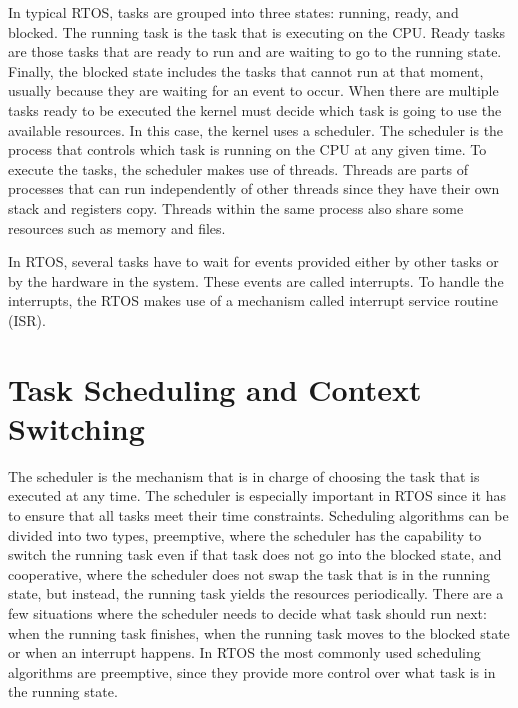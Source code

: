 In typical RTOS, tasks are grouped into three states: running, ready, and blocked. The running task is the task that is executing on the CPU. Ready tasks are those tasks that are ready to run and are waiting to go to the running state. Finally, the blocked state includes the tasks that cannot run at that moment, usually because they are waiting for an event to occur. When there are multiple tasks ready to be executed the kernel must decide which task is going to use the available resources. In this case, the kernel uses a scheduler. The scheduler is the process that controls which task is running on the CPU at any given time. To execute the tasks, the scheduler makes use of threads. Threads are parts of processes that can run independently of other threads since they have their own stack and registers copy. Threads within the same process also share some resources such as memory and files.

In RTOS, several tasks have to wait for events provided either by other tasks or by the hardware in the system. These events are called interrupts. To handle the interrupts, the RTOS makes use of a mechanism called interrupt service routine (ISR). 



\section{Task Scheduling and Context Switching}
The scheduler is the mechanism that is in charge of choosing the task that is executed at any time. The scheduler is especially important in RTOS since it has to ensure that all tasks meet their time constraints. Scheduling algorithms can be divided into two types, preemptive, where the scheduler has the capability to switch the running task even if that task does not go into the blocked state, and cooperative, where the scheduler does not swap the task that is in the running state, but instead, the running task yields the resources periodically. There are a few situations where the scheduler needs to decide what task should run next: when the running task finishes, when the running task moves to the blocked state or when an interrupt happens. In RTOS the most commonly used scheduling algorithms are preemptive, since they provide more control over what task is in the running state.

